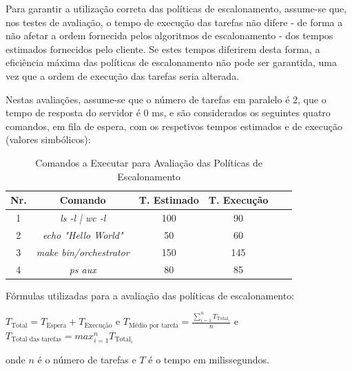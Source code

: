 \documentclass[a4paper,11pt]{scrreprt}
\begin{document}
    Para garantir a utilização correta das políticas de escalonamento,
    assume-se que, nos testes de avaliação, o tempo de execução das tarefas
    não difere - de forma a não afetar a ordem fornecida pelos algoritmos
    de escalonamento - dos tempos estimados fornecidos pelo cliente.
    Se estes tempos diferirem desta forma, a eficiência máxima das políticas de escalonamento
    não pode ser garantida, uma vez que a ordem de execução das tarefas seria alterada.

    Nestas avaliações, assume-se que o número de tarefas em paralelo é 2,
    que o tempo de resposta do servidor é 0 ms,
    e são considerados os seguintes quatro comandos, em fila de espera,
    com os respetivos tempos estimados e de execução (valores simbólicos):

    \begin{table}[!ht]
        \centering
        \begin{tabular}{|c|c|c|c|c|c|}
            \hline
            \rowcolor{gray!20!white}
            \textbf{Nr.} & \textbf{Comando} & \textbf{T. Estimado} & \textbf{T. Execução} \\
            \hline
            1 & \textit{ls -l | wc -l} & 100 &  90 \\
            \hline
            2 & \textit{echo "Hello World"} &  50 &  60 \\
            \hline
            3 & \textit{make bin/orchestrator} & 150 & 145 \\
            \hline
            4 & \textit{ps aux} &  80 &  85 \\
            \hline
        \end{tabular}
        \caption{\small Comandos a Executar para Avaliação das Políticas de Escalonamento}
    \end{table}

    Fórmulas utilizadas para a avaliação das políticas de escalonamento:

    \begin{minipage}{\textwidth}
        \centering
        $T_{\text{Total}} = T_{\text{Espera}} + T_{\text{Execução}}$
        \quad e \quad
        $T_{\text{Médio por tarefa}} = \frac{\sum_{i=1}^{n} T_{\text{Total}_{i}}}{n}$
        \quad e \quad
        $T_{\text{Total das tarefas}} = max_{i=1}^{n} T_{\text{Total}_{i}}$

        \vspace{0.2cm}
        onde $n$ é o número de tarefas e $T$ é o tempo em milissegundos.
    \end{minipage}
\end{document}
